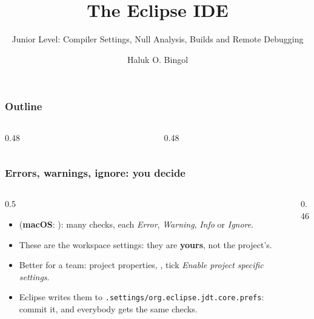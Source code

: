\documentclass[aspectratio=169,10pt,compress]{beamer}
\title{The Eclipse IDE}
\subtitle{Junior Level: Compiler Settings, Null Analysis, Builds and Remote Debugging}
\author[Bingol]{Haluk O. Bingol}
\institute[FCIS]{
    Faculty of Computer and Information Sciences\\
    Yeditepe University
}
\date{
	{\tiny \hbTimeStamp}
}
\newcommand{\mac}{\textbf{macOS}}
\begin{document}
\begin{frame}[t,fragile]
  \titlepage
\end{frame}




\begin{frame}[t,fragile] \frametitle{Outline}
  \begin{columns}[T]
    \begin{column}{0.48\textwidth}
      \tableofcontents[sections={1-4}, hideallsubsections]
    \end{column}
    \begin{column}{0.48\textwidth}
      \tableofcontents[sections={5-8}, hideallsubsections]
    \end{column}
  \end{columns}
\end{frame}





\begin{frame}[t,fragile] \frametitle{Errors, warnings, ignore: you decide}
  \begin{columns}[T]
    \begin{column}{0.5\textwidth}
      \begin{itemize}\small
        \item {} (\mac: ):
              many checks, each \emph{Error}, \emph{Warning}, \emph{Info} or \emph{Ignore}.
        \item These are the workspace settings: they are \textbf{yours}, not the project's.
        \item Better for a team: project properties, , tick
              \emph{Enable project specific settings}.
        \item Eclipse writes them to \texttt{.settings/org.eclipse.jdt.core.prefs}: commit it, and everybody gets the same checks.
      \end{itemize}
    \end{column}
    \begin{column}{0.46\textwidth}
    \end{column}
  \end{columns}
\end{frame}
\end{document}
